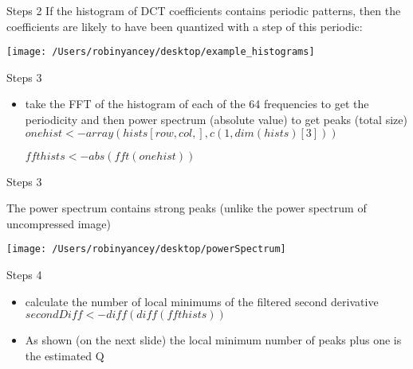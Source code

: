 \documentclass{beamer}
\begin{document}
\begin{frame}{Steps 2}
If the histogram of DCT coefficients
contains periodic patterns, then the coefficients are
likely to have been quantized with a step of this periodic:


\texttt{[image: /Users/robinyancey/desktop/example\_histograms]}
\end{frame}






\begin{frame}{Steps 3}



\begin{itemize}

\item take the FFT of the histogram of each of the 64 frequencies to get the periodicity and then power spectrum (absolute value) to get peaks (total size)
\newline
\newline
\textbf{\small{$ onehist <- array(hists[row,col,],c(1,dim(hists)[3]))  $}}
    
\textbf{\small{$     ffthists <- abs(fft(onehist))  $}}

\end{itemize}

\end{frame}


\begin{frame}{Steps 3}

The power spectrum contains strong peaks (unlike the power spectrum of uncompressed image)

\texttt{[image: /Users/robinyancey/desktop/powerSpectrum]}

\end{frame}

\begin{frame}{Steps 4}


\begin{itemize}


\item calculate the number of local minimums of the filtered second derivative
\textbf{\small{$ secondDiff <- diff(diff(ffthists)) $}}

\item As shown (on the next slide) the local minimum number of peaks plus one is the estimated Q

\end{itemize}

\end{frame}
\end{document}
